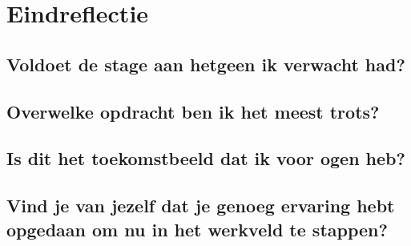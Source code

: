 \section{Eindreflectie}
\label{sec:Eindreflectie}

\subsection{Voldoet de stage aan hetgeen ik verwacht had?}

\subsection{Overwelke opdracht ben ik het meest trots?}

\subsection{Is dit het toekomstbeeld dat ik voor ogen heb?}

\subsection{Vind je van jezelf dat je genoeg ervaring hebt opgedaan om nu in het werkveld te stappen?}
